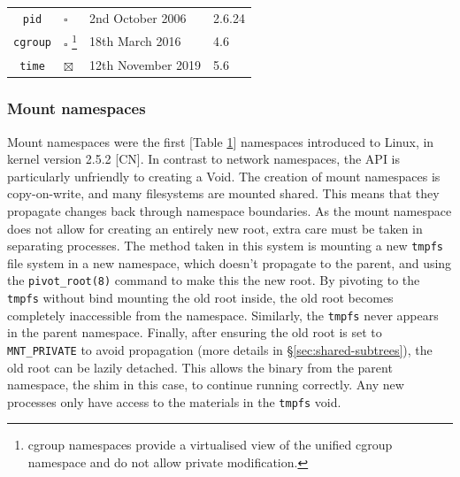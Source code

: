 \documentclass[sigplan]{acmart}
\begin{document}
\begin{table}
\begin{minipage}{\textwidth}
\begin{center}
\begin{tabular}{c|l|l|l}
        \texttt{pid}
            & $\square$
            & 2nd October 2006 \citep{bhattiprolu_patch_2006}
            & 2.6.24 \citep{noauthor_linux_2008} \\
        
        \texttt{cgroup}
            & $\square$ \footnote{cgroup namespaces provide a virtualised view of the unified cgroup namespace and do not allow private modification.}
            & 18th March 2016 \citep{heo_git_2016}
            & 4.6 \citep{torvalds_linux_2016} \\

        \texttt{time}
            & $\boxtimes$
            & 12th November 2019 \citep{vagin_ns_2020}
            & 5.6 \citep{noauthor_linux_2020}

    \end{tabular}
    \end{center}
    \end{minipage}
    
    \label{tab:namespaces}
\end{table}

\subsubsection{Mount namespaces}

Mount namespaces were the first [Table \ref{tab:namespaces}] namespaces introduced to Linux, in kernel version 2.5.2 [CN]. In contrast to network namespaces, the API is particularly unfriendly to creating a Void. The creation of mount namespaces is copy-on-write, and many filesystems are mounted shared. This means that they propagate changes back through namespace boundaries. As the mount namespace does not allow for creating an entirely new root, extra care must be taken in separating processes. The method taken in this system is mounting a new \texttt{tmpfs} file system in a new namespace, which doesn't propagate to the parent, and using the \texttt{pivot\_root(8)} command to make this the new root. By pivoting to the \texttt{tmpfs} without bind mounting the old root inside, the old root becomes completely inaccessible from the namespace. Similarly, the \texttt{tmpfs} never appears in the parent namespace. Finally, after ensuring the old root is set to \texttt{MNT\_PRIVATE} to avoid propagation (more details in §\ref{sec:shared-subtrees}), the old root can be lazily detached. This allows the binary from the parent namespace, the shim in this case, to continue running correctly. Any new processes only have access to the materials in the \texttt{tmpfs} void.
\end{document}
